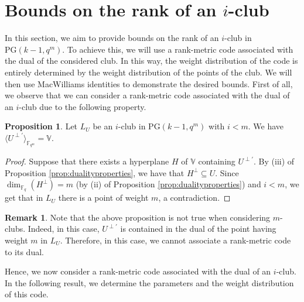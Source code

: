 \documentclass[11pt]{amsart}
\theoremstyle{definition}
\newtheorem{proposition}[theorem]{Proposition}
\newtheorem{remark}[theorem]{Remark}
\newcommand{\F}{{\mathbb F}}
\begin{document}
\section{Bounds on the rank of an $i$-club}\label{sec:bound}

In this section, we aim to provide bounds on the rank of an $i$-club in $\mathrm{PG}(k-1,q^m)$. To achieve this, we will use a rank-metric code associated with the dual of the considered club. In this way, the weight distribution of the code is entirely determined by the weight distribution of the points of the club. We will then use MacWilliams identities to demonstrate the desired bounds.
First of all, we observe that we can consider a rank-metric code associated with the dual of an $i$-club due to the following property.


\begin{proposition}\label{prop:dualconsidercode}
    Let $L_U$ be an $i$-club in PG$(k-1,q^m)$ with $i<m$. We have $\langle U^{\perp'}\rangle_{\F_{q^m}}=\mathbb{V}$. 
\end{proposition}
\begin{proof}
    Suppose that there exists a hyperplane $H$ of $\mathbb{V}$ containing $U^{\perp'}$. By (iii) of Proposition \ref{prop:dualityproperties}, we have that $H^\perp \subseteq U$.
    Since $\dim_{\F_q}(H^\perp)=m$ (by (ii) of Proposition \ref{prop:dualityproperties}) and $i<m$, we get that in $L_U$ there is a point of weight $m$, a contradiction.
\end{proof}

\begin{remark}
Note that the above proposition is not true when considering $m$-clubs. Indeed, in this case, $U^{\perp'}$ is contained in the dual of the point having weight $m$ in $L_U$. Therefore, in this case, we cannot associate a rank-metric code to its dual.
\end{remark}

Hence, we now consider a rank-metric code associated with the dual of an $i$-club. In the following result, we determine the parameters and the weight distribution of this code.
\end{document}
